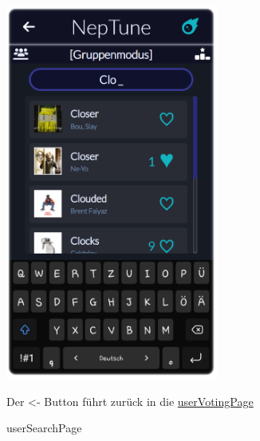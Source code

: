 \documentclass[oneside, ngerman]{sdqtechreport}
\begin{document}
\begin{figure}
    \hypertarget{userSearchPage}{}
    \begin{minipage}[t]{7 cm}
        \vspace{-1.5ex}
        \includegraphics[width=7cm]{LATEX/Pflichtenheft/GraphicDesigns/userSearchPage.png}
        \caption{userSearchPage}
    \end{minipage}
    \hspace{1cm}
    \begin{minipage}[t]{7 cm}
        \vspace{1cm}
        Der <- Button führt zurück in die \hyperlink{userVotingPage}{userVotingPage}  
    \end{minipage}
\end{figure}
\end{document}
